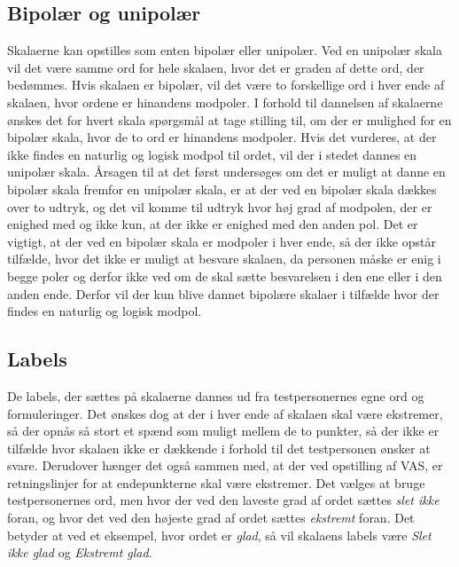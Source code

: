 \subsection{Bipolær og unipolær}
Skalaerne kan opstilles som enten bipolær eller unipolær. Ved en unipolær skala vil det være samme ord for hele skalaen, hvor det er graden af dette ord, der bedømmes. Hvis skalaen er bipolær, vil det være to forskellige ord i hver ende af skalaen, hvor ordene er hinandens modpoler. \blankline
%
I forhold til dannelsen af skalaerne ønskes det for hvert skala spørgsmål at tage stilling til, om der er mulighed for en bipolær skala, hvor de to ord er hinandens modpoler. Hvis det vurderes, at der ikke findes en naturlig og logisk modpol til ordet, vil der i stedet dannes en unipolær skala. \blankline
%
Årsagen til at det først undersøges om det er muligt at danne en bipolær skala fremfor en unipolær skala, er at der ved en bipolær skala dækkes over to udtryk, og det vil komme til udtryk hvor høj grad af modpolen, der er enighed med og ikke kun, at der ikke er enighed med den anden pol. Det er vigtigt, at der ved en bipolær skala er modpoler i hver ende, så der ikke opstår tilfælde, hvor det ikke er muligt at besvare skalaen, da personen måske er enig i begge poler og derfor ikke ved om de skal sætte besvarelsen i den ene eller i den anden ende. Derfor vil der kun blive dannet bipolære skalaer i tilfælde hvor der findes en naturlig og logisk modpol. 
%
\subsection{Labels}
%
De labels, der sættes på skalaerne dannes ud fra testpersonernes egne ord og formuleringer. 
Det ønskes dog at der i hver ende af skalaen skal være ekstremer, så der opnås så stort et spænd som muligt mellem de to punkter, så der ikke er tilfælde hvor skalaen ikke er dækkende i forhold til det testpersonen ønsker at svare. Derudover hænger det også sammen med, at der ved opstilling af VAS, er retningslinjer for at endepunkterne skal være ekstremer.\blankline
%
Det vælges at bruge testpersonernes ord, men hvor der ved den laveste grad af ordet sættes \textit{slet ikke} foran, og hvor det ved den højeste grad af ordet sættes \textit{ekstremt} foran. Det betyder at ved et eksempel, hvor ordet er \textit{glad}, så vil skalaens labels være \textit{Slet ikke glad} og \textit{Ekstremt glad}.


